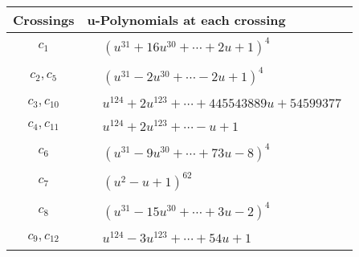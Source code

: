 \documentclass[1p]{elsarticle_modified}
\theoremstyle{definition}
\begin{document}
\begin{tabular}{m{50pt}|m{274pt}}
Crossings & \hspace{64pt}u-Polynomials at each crossing \\
\hline $$\begin{aligned}c_{1}\end{aligned}$$&$\begin{aligned}
&(u^{31}+16 u^{30}+\cdots+2 u+1)^{4}
\end{aligned}$\\
\hline $$\begin{aligned}c_{2},c_{5}\end{aligned}$$&$\begin{aligned}
&(u^{31}-2 u^{30}+\cdots-2 u+1)^{4}
\end{aligned}$\\
\hline $$\begin{aligned}c_{3},c_{10}\end{aligned}$$&$\begin{aligned}
&u^{124}+2 u^{123}+\cdots+445543889 u+54599377
\end{aligned}$\\
\hline $$\begin{aligned}c_{4},c_{11}\end{aligned}$$&$\begin{aligned}
&u^{124}+2 u^{123}+\cdots- u+1
\end{aligned}$\\
\hline $$\begin{aligned}c_{6}\end{aligned}$$&$\begin{aligned}
&(u^{31}-9 u^{30}+\cdots+73 u-8)^{4}
\end{aligned}$\\
\hline $$\begin{aligned}c_{7}\end{aligned}$$&$\begin{aligned}
&(u^2- u+1)^{62}
\end{aligned}$\\
\hline $$\begin{aligned}c_{8}\end{aligned}$$&$\begin{aligned}
&(u^{31}-15 u^{30}+\cdots+3 u-2)^{4}
\end{aligned}$\\
\hline $$\begin{aligned}c_{9},c_{12}\end{aligned}$$&$\begin{aligned}
&u^{124}-3 u^{123}+\cdots+54 u+1
\end{aligned}$\\
\hline
\end{tabular}\\~\\
\end{document}
